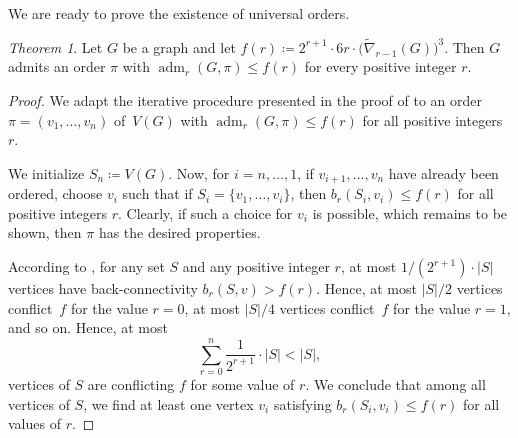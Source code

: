 \documentclass[1p,number,a4paper]{elsarticle}
\theoremstyle{remark}
\newcommand{\Qq}{\mathcal{Q}}
\newcommand{\Rr}{\mathcal{R}}
\DeclareMathOperator{\adm}{adm}
\newtheorem{theorem}{Theorem}[section]
\begin{document}
%
%
%
%
%

We are ready to prove the existence of universal orders. 

\begin{theorem}
 Let $G$ be a graph and let 
 $f(r)\coloneqq 2^{r+1}\cdot 6r\cdot \bigr(\widetilde\nabla_{r-1}(G)\bigl)^3$.
 Then $G$ admits an order $\pi$ with 
 $\adm_r(G,\pi)\leq f(r)$ for every positive integer $r$. 
\end{theorem}
\begin{proof}
We adapt the iterative procedure presented in the proof of  to an order $\pi=(v_1,\ldots,v_n)$ of~$V(G)$ 
with $\adm_r(G,\pi)\leq f(r)$ for
all positive integers $r$. 

We initialize $S_n\coloneqq V(G)$. Now, for $i=n,\ldots, 1$,
if $v_{i+1},\ldots, v_n$ have already been ordered, choose 
$v_{i}$ such that if $S_i=\{v_{1},\ldots, v_i\}$, then 
$b_r(S_i,v_i)\leq f(r)$ for all positive integers $r$. Clearly, 
if such a choice for $v_i$ is possible, which remains to be shown, then $\pi$ has the 
desired properties. 

According to , for any set $S$ and any 
positive integer $r$, 
at most $1/(2^{r+1})\cdot |S|$ vertices have back-connectivity
$b_r(S,v)>f(r)$. Hence, at most $|S|/2$ vertices 
conflict~$f$ for the value $r=0$, at most $|S|/4$ vertices
conflict~$f$ for the value $r=1$, and so on. Hence, at most 
\[\sum_{r=0}^n\frac{1}{2^{r+1}}\cdot |S|<|S|,\]
vertices of $S$ are conflicting $f$ for some value of $r$. We 
conclude that among all vertices of $S$, we find 
at least one vertex $v_i$ satisfying
$b_r(S_i,v_i)\leq f(r)$ for all values
of $r$.
\end{proof}
\end{document}
